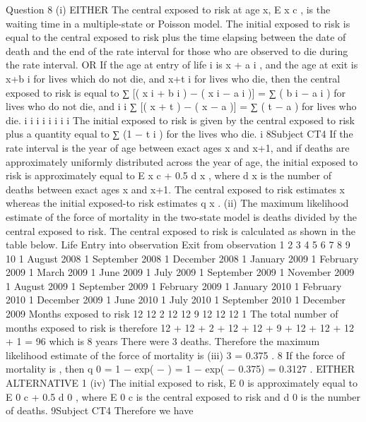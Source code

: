 \documentclass[a4paper,12pt]{article}
\begin{document}
\begin{enumerate}
Question 8
(i)
EITHER
The central exposed to risk at age x, E x c , is the waiting time in a multiple-state or
Poisson model.
The initial exposed to risk is equal to the central exposed to risk plus the time elapsing
between the date of death and the end of the rate interval for those who are observed
to die during the rate interval.
OR
If the age at entry of life i is x + a i , and the age at exit is x+b i for lives which do not
die, and x+t i for lives who die, then the central exposed to risk is equal to
∑ [( x i + b i ) − ( x i − a i )] = ∑ ( b i − a i ) for lives who do not die, and
i
i
∑ [( x + t ) − ( x − a )] = ∑ ( t − a ) for lives who die.
i
i
i
i
i
i
i
i
The initial exposed to risk is given by the central exposed to risk plus a quantity equal
to ∑ (1 − t i ) for the lives who die.
i
8Subject CT4 %
If the rate interval is the year of age between exact ages x and x+1, and if deaths are
approximately uniformly distributed across the year of age, the initial exposed to risk
is approximately equal to E x c + 0.5 d x , where d x is the number of deaths between exact
ages x and x+1.
The central exposed to risk estimates \mu x whereas the initial exposed-to risk estimates
q x .
(ii)
The maximum likelihood estimate of the force of mortality in the two-state model is
deaths divided by the central exposed to risk.
The central exposed to risk is calculated as shown in the table below.
Life Entry into
observation Exit from
observation
1
2
3
4
5
6
7
8
9
10 1 August 2008
1 September 2008
1 December 2008
1 January 2009
1 February 2009
1 March 2009
1 June 2009
1 July 2009
1 September 2009
1 November 2009 1 August 2009
1 September 2009
1 February 2009
1 January 2010
1 February 2010
1 December 2009
1 June 2010
1 July 2010
1 September 2010
1 December 2009
Months
exposed
to risk
12
12
2
12
12
9
12
12
12
1
The total number of months exposed to risk is therefore
12 + 12 + 2 + 12 + 12 + 9 + 12 + 12 + 12 + 1 = 96
which is 8 years
There were 3 deaths.
Therefore the maximum likelihood estimate of the force of mortality is
(iii)
3
= 0.375 .
8
If the force of mortality is  , then
q 0 = 1 − exp( − ) = 1 − exp( − 0.375) = 0.3127 .
EITHER ALTERNATIVE 1
(iv)
The initial exposed to risk, E 0 is approximately equal to E 0 c + 0.5 d 0 , where E 0 c is the
central exposed to risk and d 0 is the number of deaths.
9Subject CT4 %
Therefore we have

\end{enumerate}
\end{document}

